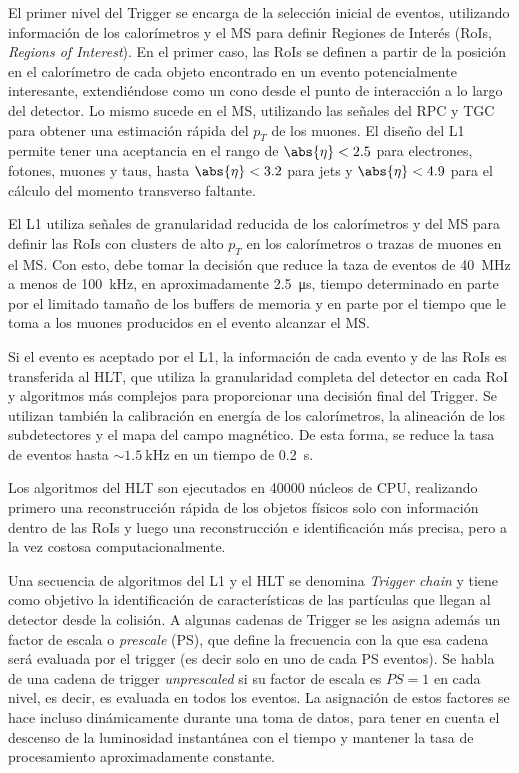 El primer nivel del Trigger se encarga de la selección inicial de eventos, utilizando información de los calorímetros y el MS para definir Regiones de Interés (RoIs, \textit{Regions of Interest}). En el primer caso, las RoIs se definen a partir de la posición en el calorímetro de cada objeto encontrado en un evento potencialmente interesante, extendiéndose como un cono desde el punto de interacción a lo largo del detector. Lo mismo sucede en el MS, utilizando las señales del RPC y TGC para obtener una estimación rápida del $p_T$ de los muones. El diseño del L1 permite tener una aceptancia en el rango de $\abs{\eta} < 2.5$ para electrones, fotones, muones y taus, hasta $\abs{\eta} < 3.2$ para jets y $\abs{\eta} < 4.9$ para el cálculo del momento transverso faltante.

El L1 utiliza señales de granularidad reducida de los calorímetros y del MS para definir las RoIs con clusters de alto $p_T$ en los calorímetros o trazas de muones en el MS. Con esto, debe tomar la decisión que reduce la taza de eventos de \SI{40}{\mega\hertz} a menos de \SI{100}{\kilo\hertz}, en aproximadamente \SI{2.5}{\micro\second}, tiempo determinado en parte por el limitado tamaño de los buffers de memoria y en parte por el tiempo que le toma a los muones producidos en el evento alcanzar el MS.

Si el evento es aceptado por el L1, la información de cada evento y de las RoIs es transferida al HLT, que utiliza la granularidad completa del detector en cada RoI y algoritmos más complejos para proporcionar una decisión final del Trigger. Se utilizan también la calibración en energía de los calorímetros, la alineación de los subdetectores y el mapa del campo magnético. De esta forma, se reduce la tasa de eventos hasta $\sim\SI{1.5}{\kilo\hertz}$ en un tiempo de \SI{0.2}{\second}.

Los algoritmos del HLT son ejecutados en 40000 núcleos de CPU, realizando primero una reconstrucción rápida de los objetos físicos solo con información dentro de las RoIs y luego una reconstrucción e identificación más precisa, pero a la vez costosa computacionalmente.

Una secuencia de algoritmos del L1 y el HLT se denomina \textit{Trigger chain} y tiene como objetivo la identificación de características de las partículas que llegan al detector desde la colisión. A algunas cadenas de Trigger se les asigna además un factor de escala o \textit{prescale} (PS), que define la frecuencia con la que esa cadena será evaluada por el trigger (es decir solo en uno de cada PS eventos). Se habla de una cadena de trigger \textit{unprescaled} si su factor de escala es $PS = 1$ en cada nivel, es decir, es evaluada en todos los eventos. La asignación de estos factores se hace incluso dinámicamente durante una toma de datos, para tener en cuenta el descenso de la luminosidad instantánea con el tiempo y mantener la tasa de procesamiento aproximadamente constante.

